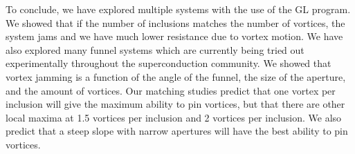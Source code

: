 To conclude, we have explored multiple systems with the use of the GL program. We showed that if the number of inclusions matches the number of vortices, the system jams and we have much lower resistance due to vortex motion. We have also explored many funnel systems which are currently being tried out experimentally throughout the superconduction community. We showed that vortex jamming is a function of the angle of the funnel, the size of the aperture, and the amount of vortices. Our matching studies predict that one vortex per inclusion will give the maximum ability to pin vortices, but that there are other local maxima at 1.5 vortices per inclusion and 2 vortices per inclusion. We also predict that a steep slope with narrow apertures will have the best ability to pin vortices.

 
